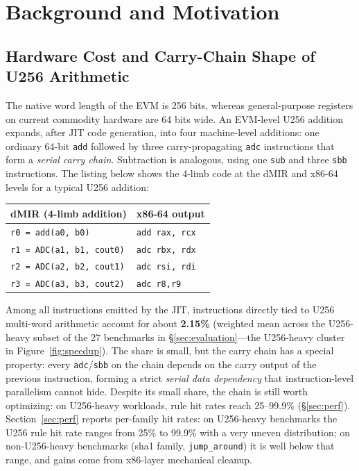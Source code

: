\section{Background and Motivation}

\subsection{Hardware Cost and Carry-Chain Shape of U256 Arithmetic}

The native word length of the EVM is 256 bits, whereas general-purpose
registers on current commodity hardware are 64 bits wide. An EVM-level
U256 addition expands, after JIT code generation, into four machine-level
additions: one ordinary 64-bit \texttt{add} followed by three
carry-propagating \texttt{adc} instructions that form a \emph{serial
carry chain}. Subtraction is analogous, using one \texttt{sub} and three
\texttt{sbb} instructions. The listing below shows the 4-limb code at
the dMIR and x86-64 levels for a typical U256 addition:

\begin{center}
\small
\begin{tabular}{@{}l|l@{}}
\textbf{dMIR (4-limb addition)} & \textbf{x86-64 output} \\
\hline
\texttt{r0 = add(a0, b0)}   & \texttt{add rax, rcx}  \\
\texttt{r1 = ADC(a1, b1, cout0)} & \texttt{adc rbx, rdx}  \\
\texttt{r2 = ADC(a2, b2, cout1)} & \texttt{adc rsi, rdi}  \\
\texttt{r3 = ADC(a3, b3, cout2)} & \texttt{adc r8,\enspace r9} \\
\end{tabular}
\end{center}

Among all instructions emitted by the JIT, instructions directly tied to
U256 multi-word arithmetic account for about \textbf{2.15\%} (weighted
mean across the U256-heavy subset of the 27 benchmarks in
\S\ref{sec:evaluation}---the U256-heavy cluster in
Figure~\ref{fig:speedup}). The share
is small, but the carry chain has a special property: every
\texttt{adc}/\texttt{sbb} on the chain depends on the carry output of the
previous instruction, forming a strict \emph{serial data dependency}
that instruction-level parallelism cannot hide.
Despite its small share, the chain is still worth optimizing: on
U256-heavy workloads, rule hit rates reach 25--99.9\%
(\S\ref{sec:perf}).
Section~\ref{sec:perf} reports per-family hit rates: on U256-heavy
benchmarks the U256 rule hit rate ranges from 25\% to 99.9\% with a
very uneven distribution; on non-U256-heavy benchmarks (sha1 family,
\texttt{jump\_around}) it is well below that range, and gains come
from x86-layer mechanical cleanup.

